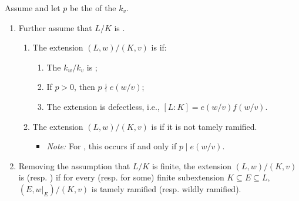 \begin{definition} \label{definition:tamely_and_wildly_ramified_extension_of_valuation_fields}
    Assume  and let $p$ be the  of the  $k_v$.
    \begin{enumerate}
        \item Further assume that $L/K$ is . 
        \begin{enumerate}
            \item The extension $(L,w)/(K,v)$ is  if:
            \begin{enumerate}
                \item The   $k_w/k_v$ is ;
                \item If $p > 0$, then $p \nmid e(w/v)$;
                \item The extension is defectless, i.e., $[L:K] = e(w/v)f(w/v)$.
            \end{enumerate}
            \item The extension $(L,w)/(K,v)$ is  if it is not tamely ramified. 
            \begin{itemize}
                \item \textit{Note:} For  , this occurs if and only if $p \mid e(w/v)$.
            \end{itemize}
        \end{enumerate}

        \item Removing the assumption that $L/K$ is finite, the extension $(L,w)/(K,v)$ is  (resp. ) if for every (resp. for some) finite subextension $K \subseteq E \subseteq L$, $(E, w|_E) /(K,v)$ is tamely ramified (resp. wildly ramified).
    \end{enumerate}
\end{definition}